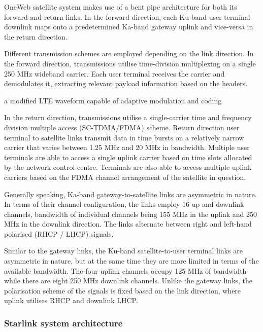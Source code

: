 \documentclass[english, 12pt, a4paper, elec, utf8, a-1b, online]{aaltothesis}
\begin{document}
OneWeb satellite system makes use of a bent pipe architecture for both its forward and return links. In the forward direction, each Ku-band user terminal downlink maps onto a predetermined Ka-band gateway uplink and vice-versa in the return direction. \cite{worldvu2016loi, portillo2019technical}

Different transmission schemes are employed depending on the link direction. In the forward direction, transmissions utilise time-division multiplexing on a single 250 MHz wideband carrier. Each user terminal receives the carrier and demodulates it, extracting relevant payload information based on the headers. \cite{worldvu2016loi}

a modified LTE waveform capable of adaptive modulation and coding \cite{allen2022terrestrial} %

In the return direction, transmissions utilise a single-carrier time and frequency division multiple access (SC-TDMA/FDMA) scheme. Return direction user terminal to satellite links transmit data in time bursts on a relatively narrow carrier that varies between 1.25 MHz and 20 MHz in bandwidth. Multiple user terminals are able to access a single uplink carrier based on time slots allocated by the network control centre. Terminals are also able to access multiple uplink carriers based on the FDMA channel arrangement of the satellite in question. \cite{worldvu2016loi}

Generally speaking, Ka-band gateway-to-satellite links are asymmetric in nature. In terms of their channel configuration, the links employ 16 up and downlink channels, bandwidth of individual channels being 155 MHz in the uplink and 250 MHz in the downlink direction. The links alternate between right and left-hand polarised (RHCP / LHCP) signals. \cite{portillo2019technical}

Similar to the gateway links, the Ku-band satellite-to-user terminal links are asymmetric in nature, but at the same time they are more limited in terms of the available bandwidth. The four uplink channels occupy 125 MHz of bandwidth while there are eight 250 MHz downlink channels. Unlike the gateway links, the polarisation scheme of the signals is fixed based on the link direction, where uplink utilises RHCP and downlink LHCP. \cite{portillo2019technical}

\subsubsection{Starlink system architecture}
\end{document}

